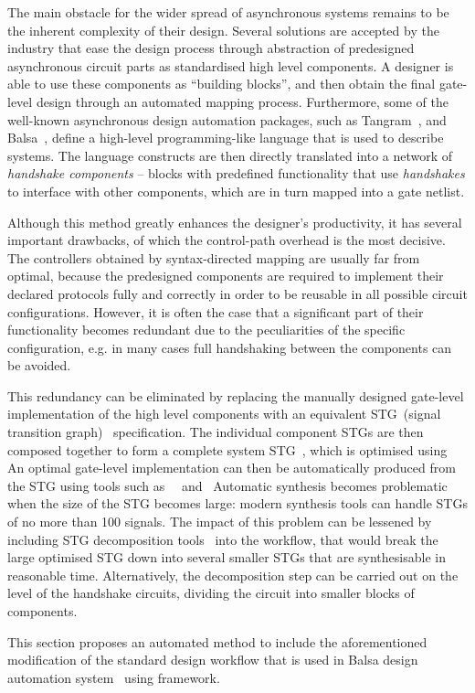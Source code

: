 The main obstacle for the wider spread of asynchronous systems remains
to be the inherent complexity of their design. Several solutions are
accepted by the industry that ease the design process through abstraction
of predesigned asynchronous circuit parts as standardised high level
components. A designer is able to use these components as ``building
blocks'', and then obtain the final gate-level design through an
automated mapping process. Furthermore, some of the well-known asynchronous
design automation packages, such as Tangram~\cite{951597}, and Balsa~\cite{balsa},
define a high-level programming-like language that is used to describe
systems. The language constructs are then directly translated into
a network of \emph{handshake components }-- blocks with predefined
functionality that use \emph{handshakes} to interface with other components,
which are in turn mapped into a gate netlist. 

Although this method greatly enhances the designer's productivity,
it has several important drawbacks, of which the control-path overhead
is the most decisive. The controllers obtained by syntax-directed
mapping are usually far from optimal, because the predesigned components
are required to implement their declared protocols fully and correctly
in order to be reusable in all possible circuit configurations. However,
it is often the case that a significant part of their functionality
becomes redundant due to the peculiarities of the specific configuration,
e.g. in many cases full handshaking between the components can be
avoided.

This redundancy can be eliminated by replacing the manually designed
gate-level implementation of the high level components with an equivalent
STG~(signal transition graph)~\cite{Yakovlev_1998_cs} specification.
The individual component STGs are then composed together to form a
complete system STG~\cite{785214}, which is optimised using \cite{cortadella_petrify}
An optimal gate-level implementation can then be automatically produced
from the STG using tools such as ~~\cite{Sentovich:M92/41}\noun{ }and~\cite{Khomenko_2004_MPSAT}
Automatic synthesis becomes problematic when the size of the STG becomes
large: modern synthesis tools can handle STGs of no more than 100
signals. The impact of this problem can be lessened by including STG
decomposition tools~\cite{DesiJ} into the workflow, that would break
the large optimised STG down into several smaller STGs that are synthesisable
in reasonable time. Alternatively, the decomposition step can be carried
out on the level of the handshake circuits, dividing the circuit into
smaller blocks of components.

This section proposes an automated method to include the aforementioned
modification of the standard design workflow that is used in Balsa
design automation system~\cite{balsa} using framework.






